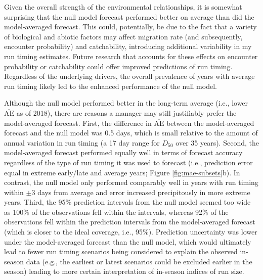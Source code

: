 \documentclass[12pt,]{book}
\theoremstyle{definition}
\theoremstyle{definition}
\theoremstyle{definition}
\theoremstyle{remark}
\begin{document}
Given the overall strength of the environmental relationships, it is
somewhat surprising that the null model forecast performed better on
average than did the model-averaged forecast. This could, potentially,
be due to the fact that a variety of biological \citetext{\citealp[size;
e.g.,][ and morphology]{bromaghin-2005}; \citealp{hamon-etal-2000}} and
abiotic factors \citetext{\citealp[temperature; e.g.,][river
discharge]{salinger-anderson-2006}; \citealp[e.g.,][and migration
distance]{keefer-etal-2004}; \citealp[e.g.,][]{eiler-etal-2015}} may
affect migration rate (and subsequently, encounter probability) and
catchability, introducing additional variability in my run timing
estimates. Future research that accounts for these effects on encounter
probability or catchability could offer improved predictions of run
timing. Regardless of the underlying drivers, the overall prevalence of
years with average run timing likely led to the enhanced performance of
the null model.

Although the null model performed better in the long-term average (i.e.,
lower \(\overline{\text{AE}}\) as of 2018), there are reasons a manager
may still justifiably prefer the model-averaged forecast. First, the
difference in \(\overline{\text{AE}}\) between the model-averaged
forecast and the null model was 0.5 days, which is small relative to the
amount of annual variation in run timing (a 17 day range for \(D_{50}\)
over 35 years). Second, the model-averaged forecast performed equally
well in terms of forecast accuracy regardless of the type of run timing
it was used to forecast (i.e., prediction error equal in extreme
early/late and average years; Figure \ref{fig:mae-subsets}b). In
contrast, the null model only performed comparably well in years with
run timing within \(\pm 3\) days from average and error increased
precipitously in more extreme years. Third, the 95\% prediction
intervals from the null model seemed too wide as 100\% of the
observations fell within the intervals, whereas 92\% of the observations
fell within the prediction intervals from the model-averaged forecast
(which is closer to the ideal coverage, i.e., 95\%). Prediction
uncertainty was lower under the model-averaged forecast than the null
model, which would ultimately lead to fewer run timing scenarios being
considered to explain the observed in-season data (e.g., the earliest or
latest scenarios could be excluded earlier in the season) leading to
more certain interpretation of in-season indices of run size.
\end{document}

